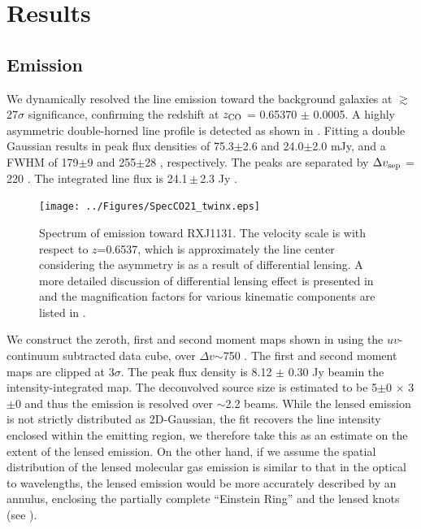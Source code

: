 \documentclass[]{emulateapj}
\begin{document}
\section{Results}
\subsection{\bco Emission} \label{sec:CO21} %
We dynamically resolved the \bco line emission toward the background galaxies
at $\gtrsim$27$\sigma$ significance, confirming the redshift at $z_{\rm CO}$ =
0.65370 $\pm$ 0.0005. A highly asymmetric double-horned line profile is
detected as shown in . Fitting a double Gaussian results in peak
flux densities of 75.3$\pm$2.6 and 24.0$\pm$2.0 mJy, and a FWHM of
179$\pm$9 \kms and 255$\pm$28 \kms, respectively. The peaks are separated by
$\Delta v_{\rm sep}$ = 220 \kms. The integrated line flux is 24.1\,$\pm$\,2.3 Jy \kms. %

\begin{figure}[tbph]
\centering
\texttt{[image: ../Figures/SpecCO21\_twinx.eps]}
\caption{ Spectrum of \bco emission toward RXJ1131. The velocity scale
is with respect to $z$=0.6537, which is approximately the line center
considering the asymmetry is as a result of differential lensing.
A more detailed discussion of differential lensing effect is presented in
 and the magnification factors for various kinematic
components are listed in .
 \label{fig:CO21spec}}
\end{figure}

We construct the zeroth, first and second moment maps shown in 
using the $uv$-continuum subtracted data cube, over $\Delta v$$\sim$750 \kms.
The first and second moment maps are clipped at 3$\sigma$.
The peak flux density is 8.12 $\pm$ 0.30 Jy\,\kms\,beam\pmOne in the intensity-integrated
map. The deconvolved source size is estimated to be 5$\pm$0 $\times$ 3$\pm$0
and thus the emission is resolved over $\sim$2.2 beams.
While the lensed emission is not strictly distributed as 2D-Gaussian,
the fit recovers the line intensity enclosed within the emitting
region, we therefore take this as an estimate on the extent of the lensed
emission. On the other hand, if we assume the spatial distribution of
the lensed molecular gas emission is similar to that in the optical to \nir
wavelengths, the lensed emission would be more accurately described by an
annulus, enclosing the partially complete ``Einstein Ring'' and
the lensed knots (see ).
\end{document}
